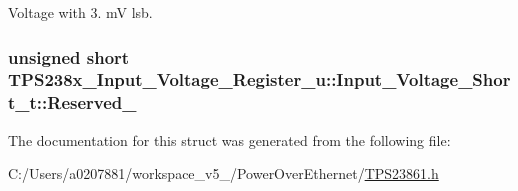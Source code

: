 Voltage with 3. m\-V lsb. 

\hypertarget{struct_t_p_s238x___input___voltage___register__u_1_1_input___voltage___short__t_a1a0f585d887fb3cb0c95d4d00d112744}{
\subsubsection[{Reserved\-\_\-12}]{\setlength{\rightskip}{0pt plus 5cm}unsigned short T\-P\-S238x\-\_\-\-Input\-\_\-\-Voltage\-\_\-\-Register\-\_\-u\-::\-Input\-\_\-\-Voltage\-\_\-\-Short\-\_\-t\-::\-Reserved\-\_}}\label{struct_t_p_s238x___input___voltage___register__u_1_1_input___voltage___short__t_a1a0f585d887fb3cb0c95d4d00d112744}


The documentation for this struct was generated from the following file\-:\begin{DoxyCompactItemize}
\item 
C\-:/\-Users/a0207881/workspace\-\_\-v5\-\_/\-Power\-Over\-Ethernet/\hyperlink{_t_p_s23861_8h}{T\-P\-S23861.\-h}\end{DoxyCompactItemize}
